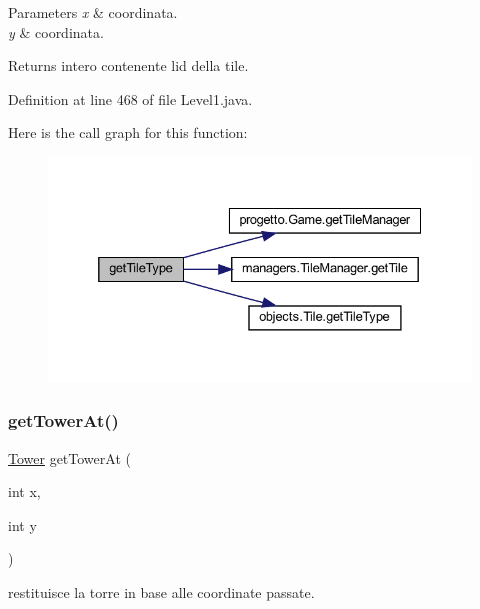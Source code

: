 \begin{DoxyParams}{Parameters}
{\em x} & coordinata. \\
\hline
{\em y} & coordinata.\\
\hline
\end{DoxyParams}
\begin{DoxyReturn}{Returns}
intero contenente l\textquotesingle{}id della tile. 
\end{DoxyReturn}


Definition at line 468 of file Level1.\+java.

Here is the call graph for this function\+:\nopagebreak
\begin{figure}[H]
\begin{center}
\leavevmode
\includegraphics[width=332pt]{classscenes_1_1_level1_ac689e72523c8460ac3160526d310b1b7_cgraph}
\end{center}
\end{figure}
\mbox{\label{classscenes_1_1_level1_a4345f2e80059788e5ab1dd1cf0ff2c04}} 
\subsubsection{\texorpdfstring{get\+Tower\+At()}{getTowerAt()}}
{\footnotesize\ttfamily \hyperlink{classtowers_1_1_tower}{Tower} get\+Tower\+At (\begin{DoxyParamCaption}\item[{int}]{x,  }\item[{int}]{y }\end{DoxyParamCaption})\hspace{0.3cm}{\ttfamily [private]}}



restituisce la torre in base alle coordinate passate. 


